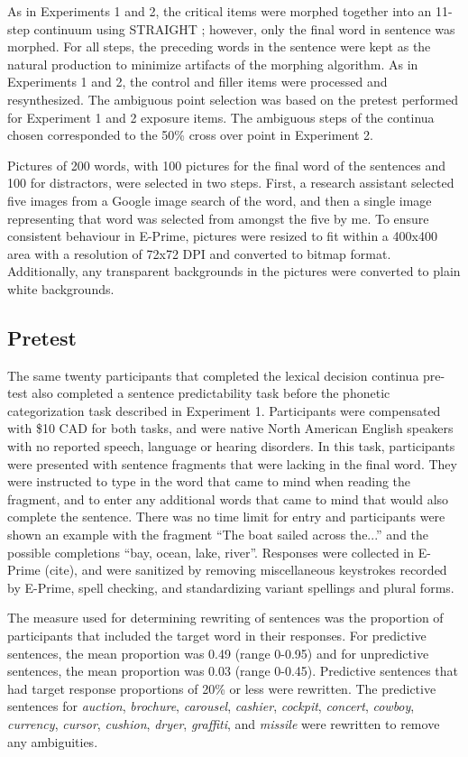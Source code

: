As in Experiments 1 and 2, the critical items were morphed together into an 11-step continuum using STRAIGHT \citep{Kawahara2008}; however, only the final word in sentence was morphed.  For all steps, the preceding words in the sentence were kept as the natural production to minimize artifacts of the morphing algorithm.  As in Experiments 1 and 2, the control and filler items were processed and resynthesized.  The ambiguous point selection was based on the pretest performed for Experiment 1 and 2 exposure items.  The ambiguous steps of the continua chosen corresponded to the 50\% cross over point in Experiment 2.

Pictures of 200 words, with 100 pictures for the final word of the sentences and 100 for distractors, were selected in two steps.  First, a research assistant selected five images from a Google image search of the word, and then a single image representing that word was selected from amongst the five by me.  To ensure consistent behaviour in E-Prime, pictures were resized to fit within a 400x400 area with a resolution of 72x72 DPI and converted to bitmap format.  Additionally, any transparent backgrounds in the pictures were converted to plain white backgrounds.

\subsection{Pretest}

The same twenty participants that completed the lexical decision continua pre-test also completed a sentence predictability task before the phonetic categorization task described in Experiment 1. Participants were compensated with \$10 CAD for both tasks, and were native North American English speakers with no reported speech, language or hearing disorders. In this task, participants were presented with sentence fragments that were lacking in the final word.  They were instructed to type in the word that came to mind when reading the fragment, and to enter any additional words that came to mind that would also complete the sentence.  There was no time limit for entry and participants were shown an example with the fragment ``The boat sailed across the...'' and the possible completions ``bay, ocean, lake, river''.  Responses were collected in E-Prime (cite), and were sanitized by removing miscellaneous keystrokes recorded by E-Prime, spell checking, and standardizing variant spellings and plural forms.

The measure used for determining rewriting of sentences was the proportion of participants that included the target word in their responses.  For predictive sentences, the mean proportion was 0.49 (range 0-0.95) and for unpredictive sentences, the mean proportion was 0.03 (range 0-0.45).  Predictive sentences that had target response proportions of 20\% or less were rewritten.  The predictive sentences for \emph{auction}, \emph{brochure}, \emph{carousel}, \emph{cashier}, \emph{cockpit}, \emph{concert}, \emph{cowboy}, \emph{currency}, \emph{cursor}, \emph{cushion}, \emph{dryer}, \emph{graffiti}, and \emph{missile} were rewritten to remove any ambiguities.  

